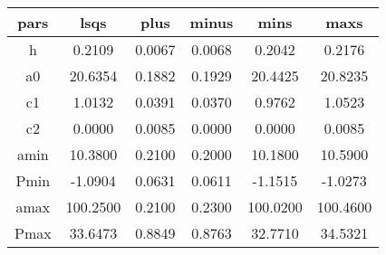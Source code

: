 \begin{table}
\begin{tabular}{cccccc}
\hline \hline
pars & lsqs & plus & minus & mins & maxs \\
\hline
h & 0.2109 & 0.0067 & 0.0068 & 0.2042 & 0.2176 \\
a0 & 20.6354 & 0.1882 & 0.1929 & 20.4425 & 20.8235 \\
c1 & 1.0132 & 0.0391 & 0.0370 & 0.9762 & 1.0523 \\
c2 & 0.0000 & 0.0085 & 0.0000 & 0.0000 & 0.0085 \\
amin & 10.3800 & 0.2100 & 0.2000 & 10.1800 & 10.5900 \\
Pmin & -1.0904 & 0.0631 & 0.0611 & -1.1515 & -1.0273 \\
amax & 100.2500 & 0.2100 & 0.2300 & 100.0200 & 100.4600 \\
Pmax & 33.6473 & 0.8849 & 0.8763 & 32.7710 & 34.5321 \\
\hline
\end{tabular}
\end{table}
